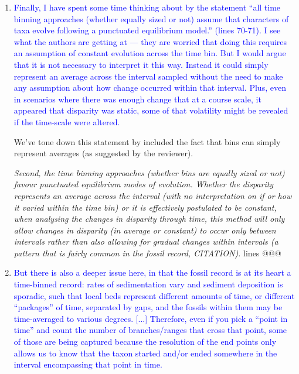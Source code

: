 \documentclass[12pt,letterpaper]{article}
\begin{document}
\begin{enumerate}
\item{\textcolor{blue}{Finally, I have spent some time thinking about by the statement ``all time binning approaches (whether equally sized or not) assume that characters of taxa evolve following a punctuated equilibrium model.'' (lines 70-71). I see what the authors are getting at — they are worried that doing this requires an assumption of constant evolution across the time bin. But I would argue that it is not necessary to interpret it this way. Instead it could simply represent an average across the interval sampled without the need to make any assumption about how change occurred within that interval. Plus, even in scenarios where there was enough change that at a course scale, it appeared that disparity was static, some of that volatility might be revealed if the time-scale were altered.}}

We've tone down this statement by included the fact that bins can simply represent averages (as suggested by the reviewer).

\textit{Second, the time binning approaches (whether bins are equally sized or not) favour punctuated equilibrium modes of evolution.
Whether the disparity represents an average across the interval (with no interpretation on if or how it varied within the time bin) or it is effectively postulated to be constant, when analysing the changes in disparity through time, this method will only allow changes in disparity (in average or constant) to occur only between intervals rather than also allowing for gradual changes within intervals (a pattern that is fairly common in the fossil record, CITATION).} lines @@@


\item{\textcolor{blue}{But there is also a deeper issue here, in that the fossil record is at its heart a time-binned record: rates of sedimentation vary and sediment deposition is sporadic, such that local beds represent different amounts of time, or different ``packages'' of time, separated by gaps, and the fossils within them may be time-averaged to various degrees. [...] Therefore, even if you pick a ``point in time'' and count the number of branches/ranges that cross that point, some of those are being captured because the resolution of the end points only allows us to know that the taxon started and/or ended somewhere in the interval encompassing that point in time.}}


\end{enumerate}
\end{document}
